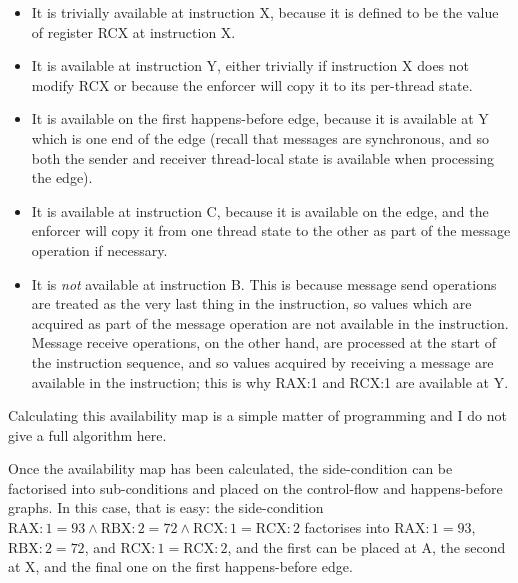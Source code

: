 \begin{itemize}

\item It is trivially available at instruction X, because it is
  defined to be the value of register RCX at instruction X.
\item It is available at instruction Y, either trivially if
  instruction X does not modify RCX or because the enforcer will copy
  it to its per-thread state.
\item It is available on the first happens-before edge, because it is
  available at Y which is one end of the edge (recall that messages
  are synchronous, and so both the sender and receiver thread-local
  state is available when processing the edge).
\item It is available at instruction C, because it is available on
  the edge, and the enforcer will copy it from one thread state to
  the other as part of the message operation if necessary.
\item It is \emph{not} available at instruction B.  This is because
  message send operations are treated as the very last thing in the
  instruction, so values which are acquired as part of the message
  operation are not available in the instruction.  Message receive
  operations, on the other hand, are processed at the start of the
  instruction sequence, and so values acquired by receiving a message
  are available in the instruction; this is why RAX:1 and RCX:1 are
  available at Y.
\end{itemize}

Calculating this availability map is a simple matter of programming
and I do not give a full algorithm here.

Once the availability map has been calculated, the side-condition can
be factorised into sub-conditions and placed on the control-flow and
happens-before graphs.  In this case, that is easy: the side-condition
$\mathrm{RAX:1} = 93 \wedge \mathrm{RBX:2} = 72 \wedge \mathrm{RCX:1}
= \mathrm{RCX:2}$ factorises into $\mathrm{RAX:1} = 93$,
$\mathrm{RBX:2} = 72$, and $\mathrm{RCX:1} = \mathrm{RCX:2}$, and the
first can be placed at A, the second at X, and the final one on the
first happens-before edge.


